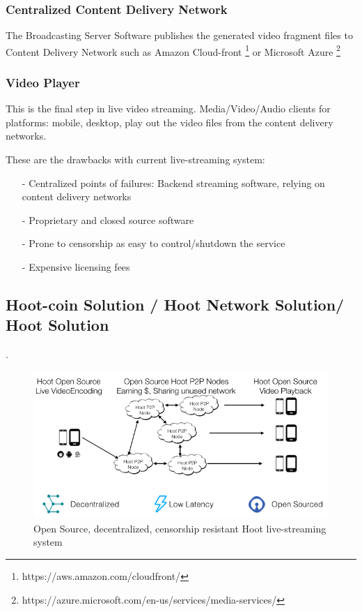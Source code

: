\documentclass{article}
\begin{document}
\subsubsection{Centralized Content Delivery Network}
The Broadcasting Server Software publishes the generated video fragment files to Content Delivery Network such as Amazon Cloud-front \footnote{https://aws.amazon.com/cloudfront/} or Microsoft Azure \footnote{https://azure.microsoft.com/en-us/services/media-services/}

\subsubsection{Video Player}
This is the final step in live video streaming. Media/Video/Audio clients for platforms: mobile, desktop, play out the video files from the content delivery networks.


These are the drawbacks with current live-streaming system:
\begin{itemize}
  \item[-]Centralized points of failures: Backend streaming software, relying on content delivery networks
  \item[-]Proprietary and closed source software
  \item[-]Prone to censorship as easy to control/shutdown the service
  \item[-]Expensive licensing fees
\end{itemize}

\subsection{Hoot-coin Solution / Hoot Network Solution/ Hoot Solution}
 .

\begin{figure}[h!]
  \centering
  \includegraphics[width=1.0\textwidth]{static/hoot-solution}
  \caption{Open Source, decentralized, censorship resistant Hoot live-streaming system}
  \label{image:hoot-solution}
\end{figure}
\end{document}
